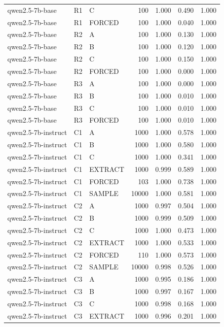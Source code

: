 \begin{table}
\begin{tabular}{lllrrrr}
qwen2.5-7b-base & R1 & C & 100 & 1.000 & 0.490 & 1.000 \\
qwen2.5-7b-base & R1 & FORCED & 100 & 1.000 & 0.040 & 1.000 \\
qwen2.5-7b-base & R2 & A & 100 & 1.000 & 0.130 & 1.000 \\
qwen2.5-7b-base & R2 & B & 100 & 1.000 & 0.120 & 1.000 \\
qwen2.5-7b-base & R2 & C & 100 & 1.000 & 0.150 & 1.000 \\
qwen2.5-7b-base & R2 & FORCED & 100 & 1.000 & 0.000 & 1.000 \\
qwen2.5-7b-base & R3 & A & 100 & 1.000 & 0.000 & 1.000 \\
qwen2.5-7b-base & R3 & B & 100 & 1.000 & 0.010 & 1.000 \\
qwen2.5-7b-base & R3 & C & 100 & 1.000 & 0.010 & 1.000 \\
qwen2.5-7b-base & R3 & FORCED & 100 & 1.000 & 0.010 & 1.000 \\
qwen2.5-7b-instruct & C1 & A & 1000 & 1.000 & 0.578 & 1.000 \\
qwen2.5-7b-instruct & C1 & B & 1000 & 1.000 & 0.580 & 1.000 \\
qwen2.5-7b-instruct & C1 & C & 1000 & 1.000 & 0.341 & 1.000 \\
qwen2.5-7b-instruct & C1 & EXTRACT & 1000 & 0.999 & 0.589 & 1.000 \\
qwen2.5-7b-instruct & C1 & FORCED & 103 & 1.000 & 0.738 & 1.000 \\
qwen2.5-7b-instruct & C1 & SAMPLE & 10000 & 1.000 & 0.581 & 1.000 \\
qwen2.5-7b-instruct & C2 & A & 1000 & 0.997 & 0.504 & 1.000 \\
qwen2.5-7b-instruct & C2 & B & 1000 & 0.999 & 0.509 & 1.000 \\
qwen2.5-7b-instruct & C2 & C & 1000 & 1.000 & 0.473 & 1.000 \\
qwen2.5-7b-instruct & C2 & EXTRACT & 1000 & 1.000 & 0.533 & 1.000 \\
qwen2.5-7b-instruct & C2 & FORCED & 110 & 1.000 & 0.573 & 1.000 \\
qwen2.5-7b-instruct & C2 & SAMPLE & 10000 & 0.998 & 0.526 & 1.000 \\
qwen2.5-7b-instruct & C3 & A & 1000 & 0.995 & 0.186 & 1.000 \\
qwen2.5-7b-instruct & C3 & B & 1000 & 0.997 & 0.167 & 1.000 \\
qwen2.5-7b-instruct & C3 & C & 1000 & 0.998 & 0.168 & 1.000 \\
qwen2.5-7b-instruct & C3 & EXTRACT & 1000 & 0.996 & 0.201 & 1.000 \\

\end{tabular}
\end{table}
